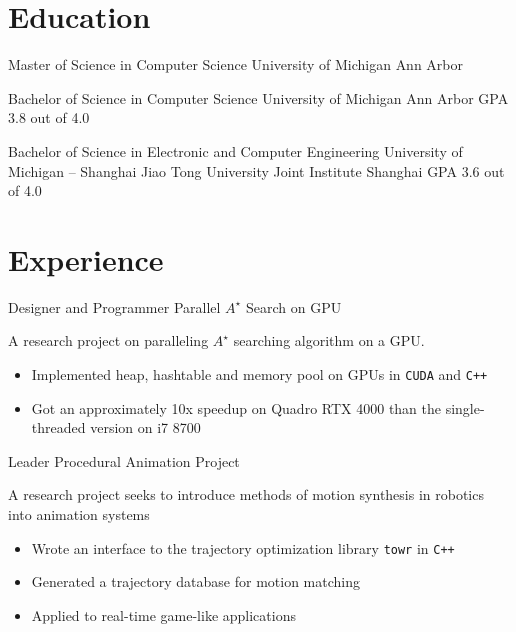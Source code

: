 \documentclass[10pt, a4paper, sans]{moderncv}
\title{}
\begin{document}
\makecvtitle

\section{Education}
{Master of Science in Computer Science}
{University of Michigan}
{Ann Arbor}
{}
{}

{Bachelor of Science in Computer Science}
{University of Michigan}
{Ann Arbor}
{GPA 3.8 out of 4.0}
{}

{Bachelor of Science in Electronic and Computer Engineering}
{University of Michigan -- Shanghai Jiao Tong University Joint Institute}
{Shanghai}
{GPA 3.6 out of 4.0}
{}

\section{Experience}
{Designer and Programmer}
{Parallel $A^\star$ Search on GPU}{}{}
{
	A research project on paralleling $A^\star$ searching algorithm on a GPU.
	\begin{itemize}
		\item Implemented heap, hashtable and memory pool on GPUs in \texttt{CUDA} and \texttt{C++}
		\item Got an approximately 10x speedup on Quadro RTX 4000 than the single-threaded version on i7 8700
	\end{itemize}
}

{Leader}
{Procedural Animation Project}
{}{}
{
	A research project seeks to introduce methods of motion synthesis in robotics into animation systems
	\begin{itemize}
		\item Wrote an interface to the trajectory optimization library \texttt{towr} in \texttt{C++}
		\item Generated a trajectory database for motion matching
		\item Applied to real-time game-like applications
	\end{itemize}
}
\end{document}

